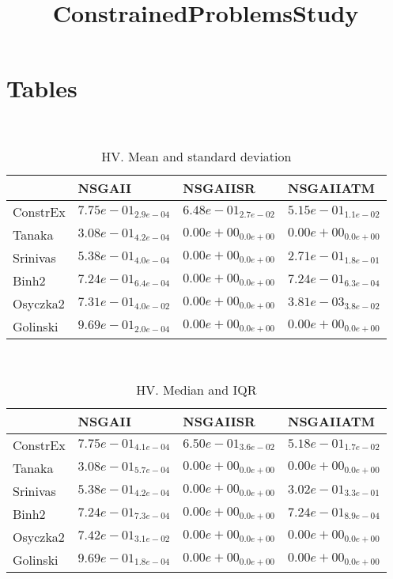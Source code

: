 \documentclass{article}
\title{ConstrainedProblemsStudy}
\author{}
\begin{document}
\maketitle
\section{Tables}
\
\begin{table}
\caption{HV. Mean and standard deviation}
\label{table:mean.HV}
\centering
\begin{scriptsize}
\begin{tabular}{llll}
\hline & NSGAII & NSGAIISR &  NSGAIIATM\\
\hline
ConstrEx & \cellcolor{gray95}$  7.75e-01_{ 2.9e-04}$ & \cellcolor{gray25}$  6.48e-01_{ 2.7e-02}$ & $  5.15e-01_{ 1.1e-02}$ \\
Tanaka & \cellcolor{gray95}$  3.08e-01_{ 4.2e-04}$ & $  0.00e+00_{ 0.0e+00}$ & $  0.00e+00_{ 0.0e+00}$ \\
Srinivas & \cellcolor{gray95}$  5.38e-01_{ 4.0e-04}$ & $  0.00e+00_{ 0.0e+00}$ & $  2.71e-01_{ 1.8e-01}$ \\
Binh2 & \cellcolor{gray95}$  7.24e-01_{ 6.4e-04}$ & $  0.00e+00_{ 0.0e+00}$ & $  7.24e-01_{ 6.3e-04}$ \\
Osyczka2 & \cellcolor{gray95}$  7.31e-01_{ 4.0e-02}$ & $  0.00e+00_{ 0.0e+00}$ & $  3.81e-03_{ 3.8e-02}$ \\
Golinski & \cellcolor{gray95}$  9.69e-01_{ 2.0e-04}$ & $  0.00e+00_{ 0.0e+00}$ & $  0.00e+00_{ 0.0e+00}$ \\
\hline
\end{tabular}
\end{scriptsize}
\end{table}
\
\begin{table}
\caption{HV. Median and IQR}
\label{table:median.HV}
\begin{scriptsize}
\centering
\begin{tabular}{llll}
\hline & NSGAII & NSGAIISR &  NSGAIIATM\\
\hline
ConstrEx & \cellcolor{gray95}$  7.75e-01_{ 4.1e-04}$ & \cellcolor{gray25}$  6.50e-01_{ 3.6e-02}$ & $  5.18e-01_{ 1.7e-02}$ \\
Tanaka & \cellcolor{gray95}$  3.08e-01_{ 5.7e-04}$ & $  0.00e+00_{ 0.0e+00}$ & $  0.00e+00_{ 0.0e+00}$ \\
Srinivas & \cellcolor{gray95}$  5.38e-01_{ 4.2e-04}$ & $  0.00e+00_{ 0.0e+00}$ & $  3.02e-01_{ 3.3e-01}$ \\
Binh2 & \cellcolor{gray95}$  7.24e-01_{ 7.3e-04}$ & $  0.00e+00_{ 0.0e+00}$ & $  7.24e-01_{ 8.9e-04}$ \\
Osyczka2 & \cellcolor{gray95}$  7.42e-01_{ 3.1e-02}$ & $  0.00e+00_{ 0.0e+00}$ & $  0.00e+00_{ 0.0e+00}$ \\
Golinski & \cellcolor{gray95}$  9.69e-01_{ 1.8e-04}$ & $  0.00e+00_{ 0.0e+00}$ & $  0.00e+00_{ 0.0e+00}$ \\
\hline
\end{tabular}
\end{scriptsize}
\end{table}
\end{document}
